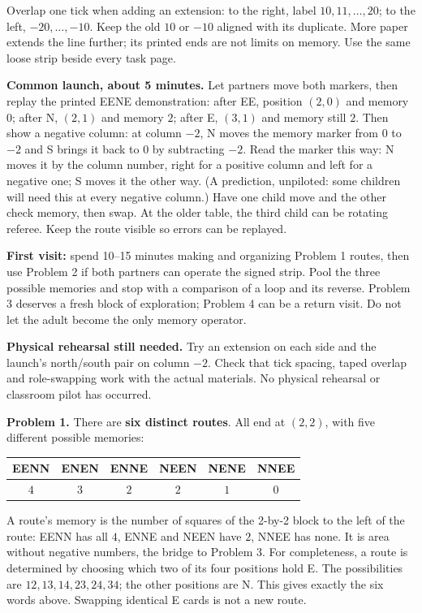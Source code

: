 \documentclass[11pt,letterpaper]{article}
\newcommand{\sectiontitle}[1]{\par\vspace{4pt}{\large\bfseries #1}\par}
\newcommand{\answer}[1]{\par\vspace{3pt}\textbf{Problem #1.} }
\begin{document}
Overlap one tick when adding an extension: to the right, label $10,11,\ldots,20$; to the left, $-20,\ldots,-10$. Keep the old $10$ or $-10$ aligned with its duplicate. More paper extends the line further; its printed ends are not limits on memory. Use the same loose strip beside every task page.

\textbf{Common launch, about 5 minutes.} Let partners move both markers, then replay the printed EENE demonstration: after EE, position $(2,0)$ and memory $0$; after N, $(2,1)$ and memory $2$; after E, $(3,1)$ and memory still $2$. Then show a negative column: at column $-2$, N moves the memory marker from $0$ to $-2$ and S brings it back to $0$ by subtracting $-2$. Read the marker this way: N moves it by the column number, right for a positive column and left for a negative one; S moves it the other way. (A prediction, unpiloted: some children will need this at every negative column.) Have one child move and the other check memory, then swap. At the older table, the third child can be rotating referee. Keep the route visible so errors can be replayed.
\newpage
\sectiontitle{A manageable route and the first answers}
\textbf{First visit:} spend 10--15 minutes making and organizing Problem 1 routes, then use Problem 2 if both partners can operate the signed strip. Pool the three possible memories and stop with a comparison of a loop and its reverse. Problem 3 deserves a fresh block of exploration; Problem 4 can be a return visit. Do not let the adult become the only memory operator.

\textbf{Physical rehearsal still needed.} Try an extension on each side and the launch's north/south pair on column $-2$. Check that tick spacing, taped overlap and role-swapping work with the actual materials. No physical rehearsal or classroom pilot has occurred.

\answer{1} There are \textbf{six distinct routes}. All end at $(2,2)$, with five different possible memories:
\begin{center}\renewcommand{\arraystretch}{1.2}
\begin{tabular}{@{}cccccc@{}}
EENN & ENEN & ENNE & NEEN & NENE & NNEE\\\hline
$4$ & $3$ & $2$ & $2$ & $1$ & $0$
\end{tabular}\end{center}
A route's memory is the number of squares of the 2-by-2 block to the left of the route: EENN has all $4$, ENNE and NEEN have $2$, NNEE has none. It is area without negative numbers, the bridge to Problem 3. For completeness, a route is determined by choosing which two of its four positions hold E. The possibilities are $12,13,14,23,24,34$; the other positions are N. This gives exactly the six words above. Swapping identical E cards is not a new route.
\end{document}
